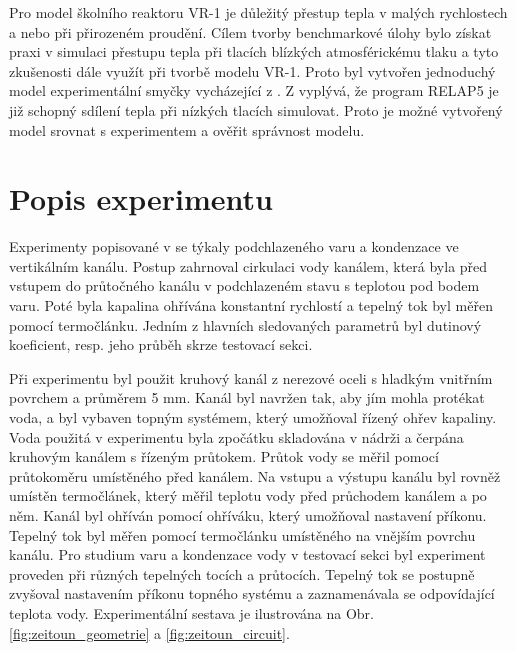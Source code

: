 

Pro model školního reaktoru VR-1 je důležitý přestup tepla v malých rychlostech a nebo při přirozeném proudění. Cílem tvorby benchmarkové úlohy bylo získat praxi v simulaci přestupu tepla při tlacích blízkých atmosférickému tlaku a tyto zkušenosti dále využít při tvorbě modelu VR-1. Proto byl vytvořen jednoduchý model experimentální smyčky vycházející z \cite{zeitoun1994subcooled}. Z \cite{KONCAR2003255} vyplývá, že program RELAP5 je již schopný sdílení tepla při nízkých tlacích simulovat. Proto je možné vytvořený model srovnat s experimentem a ověřit správnost modelu.
\section{Popis experimentu}  
Experimenty popisované v \cite{zeitoun1994subcooled} se týkaly podchlazeného varu a kondenzace ve vertikálním kanálu. Postup zahrnoval cirkulaci vody kanálem, která byla před vstupem do průtočného kanálu v podchlazeném stavu s teplotou pod bodem varu. Poté byla kapalina ohřívána konstantní rychlostí a tepelný tok byl měřen pomocí termočlánku. Jedním z hlavních sledovaných parametrů byl dutinový koeficient, resp. jeho průběh skrze testovací sekci.

Při experimentu byl použit kruhový kanál z nerezové oceli s hladkým vnitřním povrchem a průměrem 5 mm. Kanál byl navržen tak, aby jím mohla protékat voda, a byl vybaven topným systémem, který umožňoval řízený ohřev kapaliny. Voda použitá v experimentu byla zpočátku skladována v nádrži a čerpána kruhovým kanálem s řízeným průtokem. Průtok vody se měřil pomocí průtokoměru umístěného před kanálem. Na vstupu a výstupu kanálu byl rovněž umístěn termočlánek, který měřil teplotu vody před průchodem kanálem a po něm. Kanál byl ohříván pomocí ohříváku, který umožňoval nastavení příkonu. Tepelný tok byl měřen pomocí termočlánku umístěného na vnějším povrchu kanálu. Pro studium varu a kondenzace vody v testovací sekci byl experiment proveden při různých tepelných tocích a průtocích. Tepelný tok se postupně zvyšoval nastavením příkonu topného systému a zaznamenávala se odpovídající teplota vody. Experimentální sestava je ilustrována na Obr. \ref{fig:zeitoun_geometrie} a \ref{fig:zeitoun_circuit}. 


